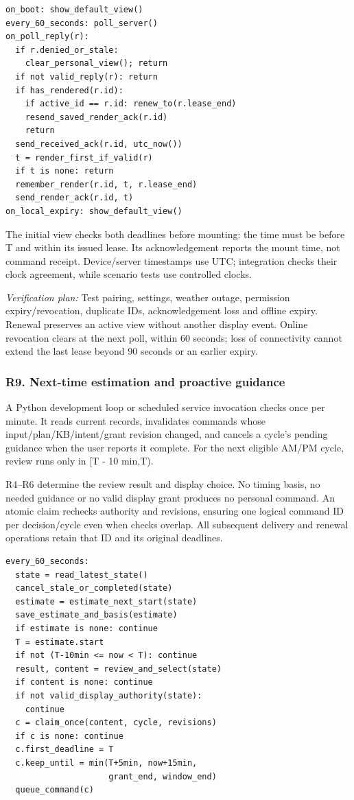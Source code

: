 \documentclass[conference,letterpaper]{IEEEtran}
\begin{document}
\begin{lstlisting}
on_boot: show_default_view()
every_60_seconds: poll_server()
on_poll_reply(r):
  if r.denied_or_stale:
    clear_personal_view(); return
  if not valid_reply(r): return
  if has_rendered(r.id):
    if active_id == r.id: renew_to(r.lease_end)
    resend_saved_render_ack(r.id)
    return
  send_received_ack(r.id, utc_now())
  t = render_first_if_valid(r)
  if t is none: return
  remember_render(r.id, t, r.lease_end)
  send_render_ack(r.id, t)
on_local_expiry: show_default_view()
\end{lstlisting}

The initial view checks both deadlines before mounting: the time must be before T and within its issued lease. Its acknowledgement reports the mount time, not command receipt. Device/server timestamps use UTC; integration checks their clock agreement, while scenario tests use controlled clocks.

\textit{Verification plan:} Test pairing, settings, weather outage, permission expiry/revocation, duplicate IDs, acknowledgement loss and offline expiry. Renewal preserves an active view without another display event. Online revocation clears at the next poll, within 60 seconds; loss of connectivity cannot extend the last lease beyond 90 seconds or an earlier expiry.

\subsubsection*{R9. Next-time estimation and proactive guidance}

A Python development loop or scheduled service invocation checks once per minute. It reads current records, invalidates commands whose input/plan/KB/intent/grant revision changed, and cancels a cycle's pending guidance when the user reports it complete. For the next eligible AM/PM cycle, review runs only in [T - 10 min,T).

R4--R6 determine the review result and display choice. No timing basis, no needed guidance or no valid display grant produces no personal command. An atomic claim rechecks authority and revisions, ensuring one logical command ID per decision/cycle even when checks overlap. All subsequent delivery and renewal operations retain that ID and its original deadlines.

\begin{lstlisting}
every_60_seconds:
  state = read_latest_state()
  cancel_stale_or_completed(state)
  estimate = estimate_next_start(state)
  save_estimate_and_basis(estimate)
  if estimate is none: continue
  T = estimate.start
  if not (T-10min <= now < T): continue
  result, content = review_and_select(state)
  if content is none: continue
  if not valid_display_authority(state):
    continue
  c = claim_once(content, cycle, revisions)
  if c is none: continue
  c.first_deadline = T
  c.keep_until = min(T+5min, now+15min,
                     grant_end, window_end)
  queue_command(c)
\end{lstlisting}
\end{document}
